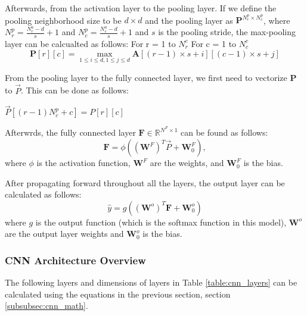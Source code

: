 \documentclass{article}
\begin{document}
Afterwards, from the activation layer to the pooling layer. If we define the pooling neighborhood size to be $d \times d$ and the pooling layer as $\textbf{P}^{N^p_r \times N^p_c}$, where $N^p_r = \frac{N^a_r-d}{s}+1$ and $N^p_c = \frac{N^a_c-d}{s}+1$ and $s$ is the pooling stride, the max-pooling layer can be calcualted as follows:\newline
\noindent For r = 1 to $N^c_r$ \newline
\noindent For c = 1 to $N^c_c$ \newline
\begin{equation*}
    \textbf{P}[r][c] = \max_{1 \leq i \leq d, 1 \leq j \leq d} \textbf{A}[(r - 1) \times s + i][(c - 1) \times s + j]
\end{equation*}

From the pooling layer to the fully connected layer, we first need to vectorize $\textbf{P}$ to $\vec{P}$. This can be done as follows:
\begin{algorithmic}
            \State $\vec{P}[(r - 1)N_c^p + c] = P[r][c]$
        \EndFor
    \EndFor
\end{algorithmic}

Afterwrds, the fully connected layer $\textbf{F}\in \mathbb{R}^{N^F \times 1}$ can be found as follows:
\begin{equation*}
    \textbf{F} = \phi((\textbf{W}^F)^T\vec{P} + \textbf{W}_0^F),
\end{equation*}
where $\phi$ is the activation function, $\textbf{W}^F$ are the weights, and $\textbf{W}_0^F$ is the bias.

After propagating forward throughout all the layers, the output layer can be calculated as follows:
\begin{equation*}
    \hat{y} = g\left((\textbf{W}^{o})^{T}\textbf{F} + \textbf{W}_{0}^{o}\right)
\end{equation*}
where $g$ is the output function (which is the softmax function in this model), $\textbf{W}^{o}$ are the output layer weights and $\textbf{W}_{0}^{o}$ is the bias.

\subsubsection{CNN Architecture Overview}
The following layers and dimensions of layers in Table \ref{table:cnn_layers} can be calculated using the equations in the previous section, section \ref{subsubsec:cnn_math}.
\end{document}
